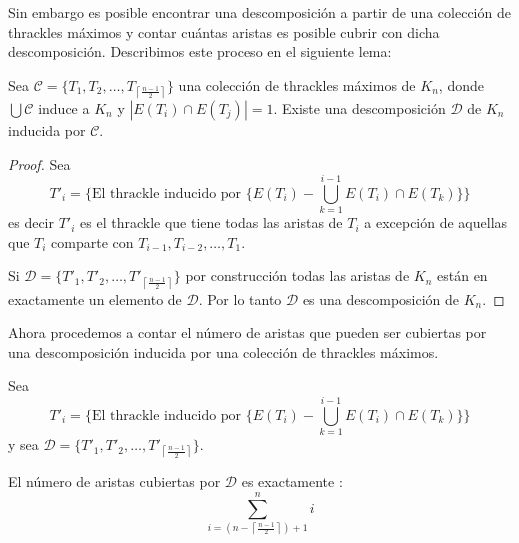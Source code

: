 Sin embargo es posible encontrar una descomposición a partir de una colección de thrackles
máximos y contar cuántas aristas es posible cubrir con dicha descomposición. Describimos
este proceso en el siguiente lema:
\begin{lemma}\label{lema:existedescomp}
  Sea $\mathcal{C}=\{T_1,T_2,\dots,T_{\left\lceil\frac{n-1}{2}\right\rceil}\}$ una colección
  de thrackles máximos de $K_n$, donde $\bigcup\mathcal{C}$ induce a $K_n$ y $|E(T_i)\cap E(T_j)| = 1$.
  Existe una descomposición $\mathcal{D}$ de $K_n$ inducida por $\mathcal{C}$.
\end{lemma}
\begin{proof}
  Sea \[T'_i = \{\text{El thrackle inducido por } \{E(T_i) - \bigcup_{k=1}^{i-1} E(T_i)\cap E(T_k)\} \}\]
  es decir $T'_i$ es el thrackle que tiene todas las aristas de $T_i$
  a excepción de aquellas que $T_i$ comparte con $T_{i-1},T_{i-2},\dots,T_{1}$.

  Si $\mathcal{D}=\{T'_1,T'_2,\dots,T'_{\left\lceil\frac{n-1}{2}\right\rceil}\}$ por construcción todas las aristas de $K_n$ están en
  exactamente un elemento de $\mathcal{D}$. Por lo tanto $\mathcal{D}$ es una descomposición de $K_n$.
\end{proof}
Ahora procedemos a contar el número de aristas que pueden ser cubiertas por una descomposición
inducida por una colección de thrackles máximos.
\begin{lemma}\label{lema:numaristascubiertas}
  Sea \[T'_i = \{\text{El thrackle inducido por } \{E(T_i) - \bigcup_{k=1}^{i-1} E(T_i)\cap E(T_k)\} \}\]
  y sea  $\mathcal{D}=\{T'_1,T'_2,\dots,T'_{\left\lceil\frac{n-1}{2}\right\rceil}\}.$

  El número de aristas cubiertas por $\mathcal{D}$ es exactamente :
   \[\displaystyle \sum^n_{i=\left(n-\left\lceil\frac{n-1}{2}\right\rceil\right) + 1}i\]
 \end{lemma}
